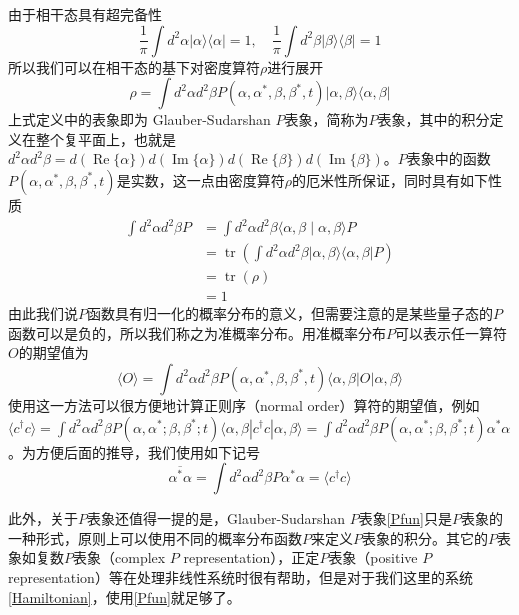 由于相干态具有超完备性
\begin{equation}
\frac{1}{\pi} \int d^{2} \alpha|\alpha\rangle\langle\alpha|=1, \quad
\frac{1}{\pi} \int d^{2} \beta|\beta\rangle\langle\beta|=1
\end{equation}
所以我们可以在相干态的基下对密度算符$\rho$进行展开
\begin{equation}
\rho=\int d^{2}\alpha d^{2}\beta P(\alpha,\alpha^{*},\beta,\beta^{*},t)|\alpha,\beta\rangle \langle \alpha,\beta| \label{Pfun} 
\end{equation}
上式定义中的表象即为 Glauber-Sudarshan $P$表象，简称为$P$表象，其中的积分定义在整个复平面上，也就是$d^{2} \alpha d^{2} \beta=d(\operatorname{Re}\{\alpha\}) d(\operatorname{Im}\{\alpha\}) d(\operatorname{Re}\{\beta\}) d(\operatorname{Im}\{\beta\})$。$P$表象中的函数$P(\alpha,\alpha^{*},\beta,\beta^{*},t)$是实数，这一点由密度算符$\rho$的厄米性所保证，同时具有如下性质
\begin{equation}
\begin{aligned}
\int d^{2} \alpha d^{2}\beta P &=\int d^{2} \alpha d^{2}\beta \langle\alpha,\beta \mid \alpha,\beta \rangle P \\
&=\operatorname{tr}\left(\int d^{2} \alpha d^{2}\beta |\alpha,\beta\rangle\langle\alpha,\beta| P\right) \\
&=\operatorname{tr}(\rho) \\
&=1
\end{aligned}
\end{equation}
由此我们说$P$函数具有归一化的概率分布的意义，但需要注意的是某些量子态的$P$函数可以是负的，所以我们称之为准概率分布。用准概率分布$P$可以表示任一算符$O$的期望值为
\begin{equation}
\langle{O}\rangle=\int d^{2}\alpha d^{2}\beta P(\alpha,\alpha^{*},\beta,\beta^{*},t)\langle \alpha,\beta|O|\alpha,\beta\rangle
\end{equation}
使用这一方法可以很方便地计算正则序（normal order）算符的期望值，例如$\langle c^{\dagger}c \rangle = \int d^{2}\alpha d^{2}\beta P(\alpha,\alpha^{*};\beta,\beta^{*};t) \langle \alpha,\beta|c^{\dagger}c|\alpha,\beta\rangle = \int d^{2}\alpha d^{2}\beta P(\alpha,\alpha^{*};\beta,\beta^{*};t)\alpha^{*}\alpha$。为方便后面的推导，我们使用如下记号
\begin{equation}
\overline{\alpha^{*}\alpha} = \int d^{2}\alpha d^{2}\beta P\alpha^{*}\alpha = \langle c^{\dagger}c \rangle
\end{equation}

此外，关于$P$表象还值得一提的是，Glauber-Sudarshan $P$表象\eqref{Pfun}只是$P$表象的一种形式，原则上可以使用不同的概率分布函数$P$来定义$P$表象的积分\cite{}。其它的$P$表象如复数$P$表象（complex $P$ representation），正定$P$表象（positive $P$ representation）等在处理非线性系统时很有帮助，但是对于我们这里的系统 \eqref{Hamiltonian}，使用\eqref{Pfun}就足够了。

